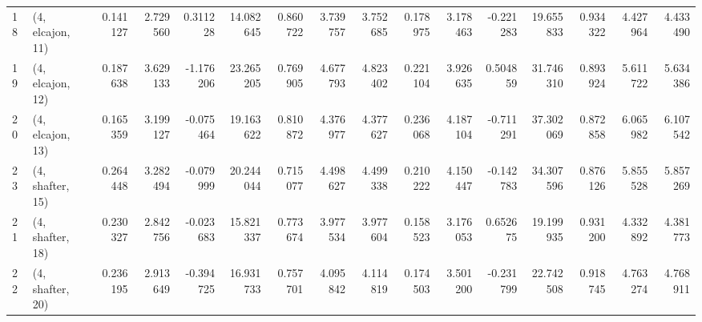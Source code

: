 \begin{tabular}{llrrrrrrrrrrrrrr}
18 &  (4, elcajon, 11) &   0.141127 &  2.729560 &  0.311228 &  14.082645 &  0.860722 &   3.739757 &  3.752685 &  0.178975 &  3.178463 & -0.221283 &   19.655833 &  0.934322 &   4.427964 &   4.433490 \\
19 &  (4, elcajon, 12) &   0.187638 &  3.629133 & -1.176206 &  23.265205 &  0.769905 &   4.677793 &  4.823402 &  0.221104 &  3.926635 &  0.504859 &   31.746310 &  0.893924 &   5.611722 &   5.634386 \\
20 &  (4, elcajon, 13) &   0.165359 &  3.199127 & -0.075464 &  19.163622 &  0.810872 &   4.376977 &  4.377627 &  0.236068 &  4.187104 & -0.711291 &   37.302069 &  0.872858 &   6.065982 &   6.107542 \\
23 &  (4, shafter, 15) &   0.264448 &  3.282494 & -0.079999 &  20.244044 &  0.715077 &   4.498627 &  4.499338 &  0.210222 &  4.150447 & -0.142783 &   34.307596 &  0.876126 &   5.855528 &   5.857269 \\
21 &  (4, shafter, 18) &   0.230327 &  2.842756 & -0.023683 &  15.821337 &  0.773674 &   3.977534 &  3.977604 &  0.158523 &  3.176053 &  0.652675 &   19.199935 &  0.931200 &   4.332892 &   4.381773 \\
22 &  (4, shafter, 20) &   0.236195 &  2.913649 & -0.394725 &  16.931733 &  0.757701 &   4.095842 &  4.114819 &  0.174503 &  3.501200 & -0.231799 &   22.742508 &  0.918745 &   4.763274 &   4.768911 \\
\bottomrule
\end{tabular}
